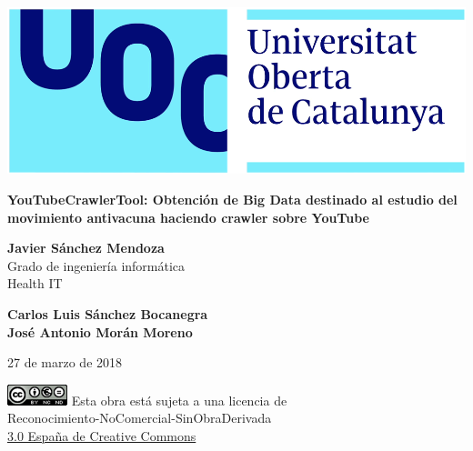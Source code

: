 \documentclass[11pt,a4paper]{article}
\begin{document}
\begin{titlepage}
\includegraphics[scale=0.2,right,valign=t]{uoc-logo.png}
\vspace*{\fill}
\begin{flushleft}
{\LARGE \textbf{YouTubeCrawlerTool: Obtención de Big Data destinado al estudio del movimiento antivacuna haciendo crawler sobre YouTube}}
\end{flushleft}
\begin{flushleft}
\textbf{Javier Sánchez Mendoza}\\
Grado de ingeniería informática\\
Health IT
\end{flushleft}
\begin{flushleft}
\textbf{Carlos Luis Sánchez Bocanegra}\\
\textbf{José Antonio Morán Moreno}
\end{flushleft}
\begin{flushleft}
27 de marzo de 2018  
\end{flushleft}
\end{titlepage}


\begin{titlepage}
\vspace*{\fill}
\begin{flushleft}
\includegraphics[scale=1,left]{licencia-cc.png}
Esta obra está sujeta a una licencia de\\
Reconocimiento-NoComercial-SinObraDerivada\\
\href{http://creativecommons.org/licenses/by-nc-nd/3.0/es/}{3.0 España de Creative Commons}
\end{flushleft}
\end{titlepage}
\end{document}
